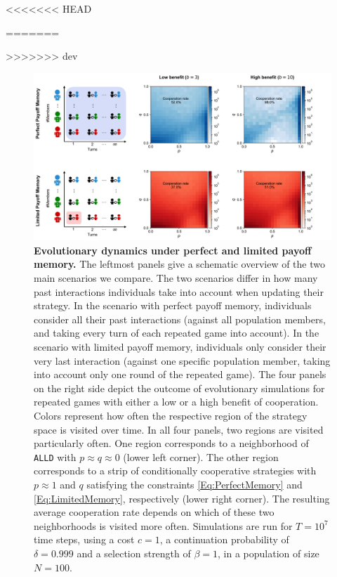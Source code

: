 \documentclass[11pt]{article}
\def\alld{\texttt{ALLD}}
\theoremstyle{plainCl1}
\theoremstyle{plainCl2}
\begin{document}

{
{\setlength{\bibsep}{0\baselineskip}


}
<<<<<<< HEAD

=======
}
>>>>>>> dev



\clearpage
\newpage

\begin{figure}[t]
    \centering
    \includegraphics[width=\textwidth]{static/donation_expected_last_round_summary_results.pdf}
    \caption{{\bf Evolutionary dynamics under perfect and limited payoff memory.}
    The leftmost panels give a schematic overview of the two main scenarios we compare. 
    The two scenarios differ in how many past interactions individuals take into account when updating their strategy. 
    In the scenario with perfect payoff memory, individuals consider all their past interactions (against all population members, and taking every turn of each repeated game into account). 
    In the scenario with limited payoff memory, individuals only consider their very last interaction (against one specific population member, taking into account only one round of the repeated game). 
    The four panels  on the right side depict the outcome of evolutionary simulations for repeated games with either a low or a high benefit of cooperation. 
    Colors represent how often the respective region of the strategy space is visited over time. 
    In all four panels, two regions are visited particularly often. 
    One region corresponds to a neighborhood of \alld{} with $p\approx q\!\approx\!0$ (lower left corner). 
    The other region corresponds to a strip of conditionally cooperative strategies with $p\!\approx\! 1$ and $q$ satisfying the constraints \eqref{Eq:PerfectMemory} and \eqref{Eq:LimitedMemory}, respectively (lower right corner). 
    The resulting average cooperation rate depends on which of these two neighborhoods is visited more often. 
    Simulations are run for $T\!=\!10^7$ time steps, using a cost $c\!=\!1$, a continuation probability of $\delta\!=\!0.999$ and a selection strength of $\beta\!=\!1$, in a population of size $N\!=\!100$.}
\label{fig:expected_and_stochastic_for_donation}
\end{figure}
\end{document}
